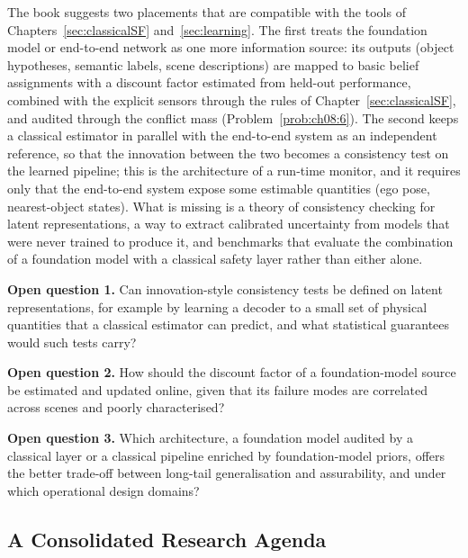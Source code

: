 The book suggests two placements that are compatible with the tools of Chapters~\ref{sec:classicalSF} and~\ref{sec:learning}. The first treats the foundation model or end-to-end network as one more information source: its outputs (object hypotheses, semantic labels, scene descriptions) are mapped to basic belief assignments with a discount factor estimated from held-out performance, combined with the explicit sensors through the rules of Chapter~\ref{sec:classicalSF}, and audited through the conflict mass (Problem~\ref{prob:ch08:6}). The second keeps a classical estimator in parallel with the end-to-end system as an independent reference, so that the innovation between the two becomes a consistency test on the learned pipeline; this is the architecture of a run-time monitor, and it requires only that the end-to-end system expose some estimable quantities (ego pose, nearest-object states). What is missing is a theory of consistency checking for latent representations, a way to extract calibrated uncertainty from models that were never trained to produce it, and benchmarks that evaluate the combination of a foundation model with a classical safety layer rather than either alone.

\begin{list4a}
    \item \textbf{Open question 1.} Can innovation-style consistency tests be defined on latent representations, for example by learning a decoder to a small set of physical quantities that a classical estimator can predict, and what statistical guarantees would such tests carry?
    \item \textbf{Open question 2.} How should the discount factor of a foundation-model source be estimated and updated online, given that its failure modes are correlated across scenes and poorly characterised?
    \item \textbf{Open question 3.} Which architecture, a foundation model audited by a classical layer or a classical pipeline enriched by foundation-model priors, offers the better trade-off between long-tail generalisation and assurability, and under which operational design domains?
\end{list4a}

\subsection{A Consolidated Research Agenda}
\label{subsec:research-agenda}


